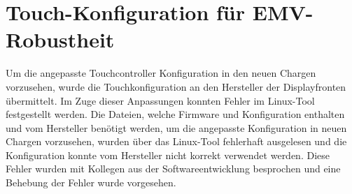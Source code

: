 \documentclass[praktikum,german]{hgbthesis}
\begin{document}
\section{Touch-Konfiguration für EMV-Robustheit}
Um die angepasste Touchcontroller Konfiguration in den neuen Chargen vorzusehen, wurde die Touchkonfiguration an den Hersteller der Displayfronten übermittelt.
Im Zuge dieser Anpassungen konnten Fehler im Linux-Tool festgestellt werden.  Die Dateien, welche Firmware und Konfiguration enthalten und vom Hersteller benötigt werden, um die angepasste Konfiguration in neuen Chargen vorzusehen, wurden über das Linux-Tool fehlerhaft ausgelesen und die Konfiguration konnte vom Hersteller nicht korrekt verwendet werden. Diese Fehler wurden mit Kollegen aus der Softwareentwicklung besprochen und eine Behebung der Fehler wurde vorgesehen.






\end{document}
